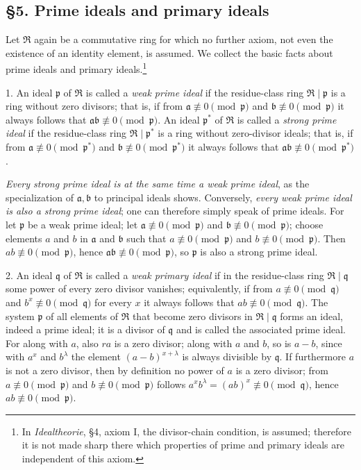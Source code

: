\documentclass[11pt]{article}
\providecommand{\mR}{\mathfrak{R}}
\providecommand{\ma}{\mathfrak{a}}
\providecommand{\mb}{\mathfrak{b}}
\providecommand{\mpideal}{\mathfrak{p}}
\providecommand{\mq}{\mathfrak{q}}
\begin{document}
\subsection*{§5. Prime ideals and primary ideals}

Let $\mR$ again be a commutative ring for which no further axiom, not even the existence of an identity element, is assumed. We collect the basic facts about prime ideals and primary ideals.\footnote{In \emph{Idealtheorie}, §4, axiom I, the divisor-chain condition, is assumed; therefore it is not made sharp there which properties of prime and primary ideals are independent of this axiom.}

1. An ideal $\mpideal$ of $\mR$ is called a \emph{weak prime ideal} if the residue-class ring $\mR\mid\mpideal$ is a ring without zero divisors; that is, if from $\ma\not\equiv0\pmod{\mpideal}$ and $\mb\not\equiv0\pmod{\mpideal}$ it always follows that $\ma\mb\not\equiv0\pmod{\mpideal}$. An ideal $\mpideal^*$ of $\mR$ is called a \emph{strong prime ideal} if the residue-class ring $\mR\mid\mpideal^*$ is a ring without zero-divisor ideals; that is, if from $\ma\not\equiv0\pmod{\mpideal^*}$ and $\mb\not\equiv0\pmod{\mpideal^*}$ it always follows that $\ma\mb\not\equiv0\pmod{\mpideal^*}$.

\emph{Every strong prime ideal is at the same time a weak prime ideal}, as the specialization of $\ma,\mb$ to principal ideals shows. Conversely, \emph{every weak prime ideal is also a strong prime ideal}; one can therefore simply speak of prime ideals. For let $\mpideal$ be a weak prime ideal; let $\ma\not\equiv0\pmod{\mpideal}$ and $\mb\not\equiv0\pmod{\mpideal}$; choose elements $a$ and $b$ in $\ma$ and $\mb$ such that $a\not\equiv0\pmod{\mpideal}$ and $b\not\equiv0\pmod{\mpideal}$. Then $ab\not\equiv0\pmod{\mpideal}$, hence $\ma\mb\not\equiv0\pmod{\mpideal}$, so $\mpideal$ is also a strong prime ideal.

2. An ideal $\mq$ of $\mR$ is called a \emph{weak primary ideal} if in the residue-class ring $\mR\mid\mq$ some power of every zero divisor vanishes; equivalently, if from $a\not\equiv0\pmod{\mq}$ and $b^x\not\equiv0\pmod{\mq}$ for every $x$ it always follows that $ab\not\equiv0\pmod{\mq}$. The system $\mpideal$ of all elements of $\mR$ that become zero divisors in $\mR\mid\mq$ forms an ideal, indeed a prime ideal; it is a divisor of $\mq$ and is called the associated prime ideal. For along with $a$, also $ra$ is a zero divisor; along with $a$ and $b$, so is $a-b$, since with $a^x$ and $b^\lambda$ the element $(a-b)^{x+\lambda}$ is always divisible by $\mq$. If furthermore $a$ is not a zero divisor, then by definition no power of $a$ is a zero divisor; from $a\not\equiv0\pmod{\mpideal}$ and $b\not\equiv0\pmod{\mpideal}$ follows $a^x b^\lambda=(ab)^x\not\equiv0\pmod{\mq}$, hence $ab\not\equiv0\pmod{\mpideal}$.
\end{document}
